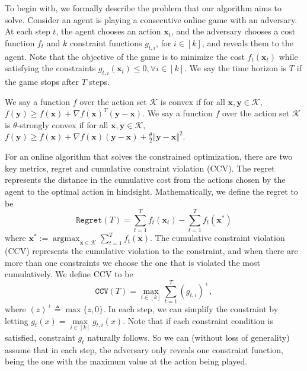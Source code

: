 \documentclass[twoside,11pt,]{article}
\newcommand{\op}[1]{\operatorname{#1}}
\newcommand{\C}[1]{\mathcal{#1}}
\newcommand{\BF}[1]{\mathbf{#1}}
\newcommand{\K}{\C{K}}
\newcommand{\x}{\BF{x}}
\newcommand{\y}{\BF{y}}
\begin{document}
To begin with, we formally describe the problem that our algorithm aims to solve. Consider an agent is playing a consecutive online game with an adversary. At each step $t$, the agent chooses an action $\x_t$, and the adversary chooses a cost function $f_t$ and $k$ constraint functions $g_{t,i}$, for $i \in [k]$, and reveals them to the agent. Note that the objective of the game is to minimize the cost $f_t(\x_t)$ while satisfying the constraints $g_{t,i}(\x_t)\leq 0, \forall i\in[k]$. We say the time horizon is $T$ if the game stops after $T$ steps.

We say a function $f$ over the action set $\K$ is convex if for all $\x,\y \in \K$, $f(\y) \geq f(\x) + \nabla f(\x)^T(\y-\x)$. We say a function $f$ over the action set $\K$ is $\theta$-strongly convex if for all $\x,\y \in \K$, $f(\y) \geq f(\x) + \nabla f(\x)(\y-\x)+\frac{\theta}{2}\Vert \y-\x \Vert^2$.


For an online algorithm that solves the constrained optimization, there are two key metrics, regret and cumulative constraint violation (CCV). The regret represents the distance in the cumulative cost from the actions chosen by the agent to the optimal action in hindsight. Mathematically, we define the regret to be
$$ \mathtt{Regret}(T)= \sum\limits_{t=1}^T f_t(\x_t) - \sum\limits_{t=1}^T f_t(\x^*) $$
where $\x^*:= \op{argmax}_{\x\in\K}\sum\limits_{t=1}^T f_t(\x)$.
The cumulative constraint violation (CCV) represents the cumulative violation to the constraint, and when there are more than one constraints we choose the one that is violated the most cumulatively. We define CCV to be
$$  \mathtt{CCV}(T) = \max\limits_{i\in[k]} \sum\limits_{t=1}^T (g_{t,i})^+, $$
where $(z)^+ \triangleq \max\{z, 0\}$. 
In each step, we can simplify the constraint by letting $g_t(x)=\max\limits_{i\in [k]}g_{t,i}(x)$. Note that if each constraint condition is satisfied, constraint $g_t$ naturally follows. So we can (without loss of generality) assume that in each step, the adversary only reveals one constraint function, being the one with the maximum value at the action being played. 
\end{document}
